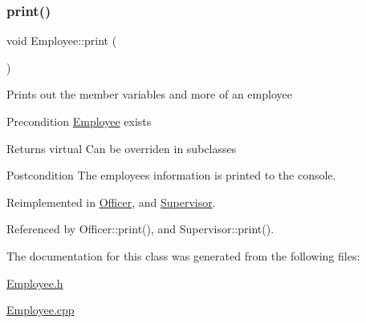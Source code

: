\subsubsection{\texorpdfstring{print()}{print()}}
{\footnotesize\ttfamily void Employee\+::print (\begin{DoxyParamCaption}{ }\end{DoxyParamCaption})\hspace{0.3cm}{\ttfamily [virtual]}}

Prints out the member variables and more of an employee

\begin{DoxyPrecond}{Precondition}
\hyperlink{classEmployee}{Employee} exists 
\end{DoxyPrecond}
\begin{DoxyReturn}{Returns}
virtual Can be overriden in subclasses 
\end{DoxyReturn}
\begin{DoxyPostcond}{Postcondition}
The employee\textquotesingle{}s information is printed to the console. 
\end{DoxyPostcond}


Reimplemented in \hyperlink{classOfficer_aeadece05a1a0b7fb29bd412830d2e07a}{Officer}, and \hyperlink{classSupervisor_a92483dc9a54904d79b46c6ec4efb3f54}{Supervisor}.



Referenced by Officer\+::print(), and Supervisor\+::print().



The documentation for this class was generated from the following files\+:\begin{DoxyCompactItemize}
\item 
\hyperlink{Employee_8h}{Employee.\+h}\item 
\hyperlink{Employee_8cpp}{Employee.\+cpp}\end{DoxyCompactItemize}
